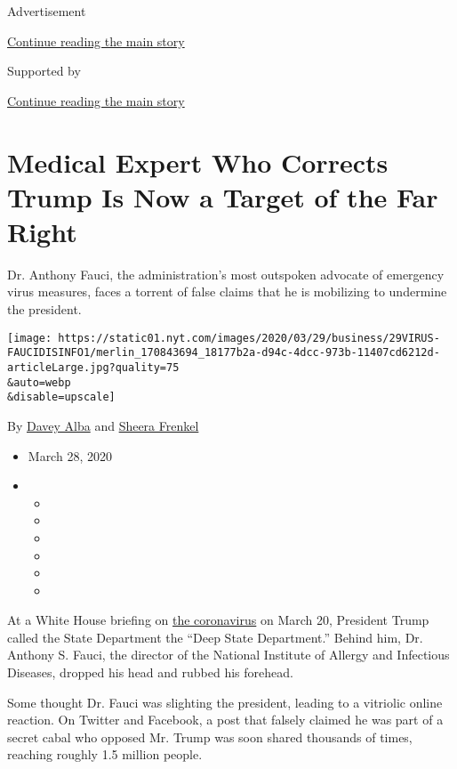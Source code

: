 Advertisement

\protect\hyperlink{after-top}{Continue reading the main story}

Supported by

\protect\hyperlink{after-sponsor}{Continue reading the main story}

\hypertarget{medical-expert-who-corrects-trump-is-now-a-target-of-the-far-right}{%
\section{Medical Expert Who Corrects Trump Is Now a Target of the Far
Right}\label{medical-expert-who-corrects-trump-is-now-a-target-of-the-far-right}}

Dr. Anthony Fauci, the administration's most outspoken advocate of
emergency virus measures, faces a torrent of false claims that he is
mobilizing to undermine the president.

\texttt{[image: https://static01.nyt.com/images/2020/03/29/business/29VIRUS-FAUCIDISINFO1/merlin\_170843694\_18177b2a-d94c-4dcc-973b-11407cd6212d-articleLarge.jpg?quality=75\\\&auto=webp\\\&disable=upscale]}

By \href{https://www.nytimes.com/by/davey-alba}{Davey Alba} and
\href{https://www.nytimes.com/by/sheera-frenkel}{Sheera Frenkel}

\begin{itemize}
\item
  March 28, 2020
\item
  \begin{itemize}
  \item
  \item
  \item
  \item
  \item
  \item
  \end{itemize}
\end{itemize}

At a White House briefing on
\href{https://www.nytimes.com/news-event/coronavirus?action=click\&pgtype=Article\&state=default\&module=styln-coronavirus\&variant=show\&region=TOP_BANNER\&context=storyline_menu}{the
coronavirus} on March 20, President Trump called the State Department
the ``Deep State Department.'' Behind him, Dr. Anthony S. Fauci, the
director of the National Institute of Allergy and Infectious Diseases,
dropped his head and rubbed his forehead.

Some thought Dr. Fauci was slighting the president, leading to a
vitriolic online reaction. On Twitter and Facebook, a post that falsely
claimed he was part of a secret cabal who opposed Mr. Trump was soon
shared thousands of times, reaching roughly 1.5 million people.

